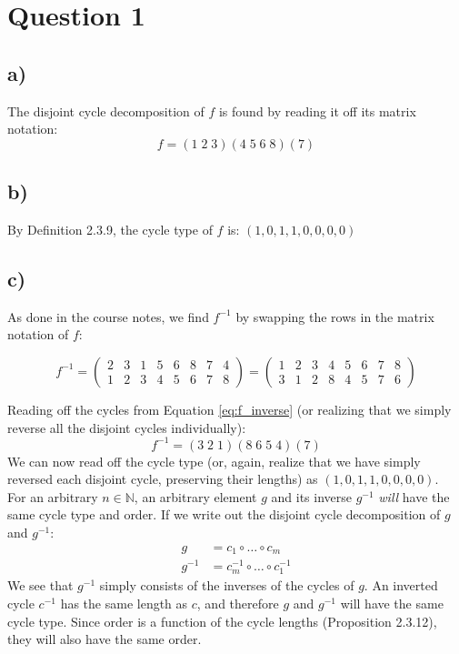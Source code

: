 \documentclass[a4paper,12pt]{article}
\begin{document}
\section*{Question 1}

\subsection*{a)}
The disjoint cycle decomposition of $f$ is found by reading it off its matrix notation:
\[
f = (1\;2\;3)(4\;5\;6\;8)(7)
\]

\subsection*{b)}
By Definition 2.3.9, the cycle type of $f$ is: $(1, 0, 1, 1, 0, 0, 0, 0)$

\subsection*{c)}
As done in the course notes, we find $f^{-1}$ by swapping the rows in the matrix notation of $f$:

\begin{equation}\label{eq:f_inverse}
f^{-1} = 
\begin{pmatrix}
    2 & 3 & 1 & 5 & 6 & 8 & 7 & 4 \\
    1 & 2 & 3 & 4 & 5 & 6 & 7 & 8
\end{pmatrix}
= 
\begin{pmatrix}
    1 & 2 & 3 & 4 & 5 & 6 & 7 & 8 \\
    3 & 1 & 2 & 8 & 4 & 5 & 7 & 6
\end{pmatrix}
\end{equation}

Reading off the cycles from Equation \ref{eq:f_inverse} (or realizing that we simply reverse all the disjoint cycles individually):
\[
f^{-1} = (3\;2\;1)(8\;6\;5\;4)(7)
\]
We can now read off the cycle type (or, again, realize that we have simply reversed each disjoint cycle, preserving their lengths) as $(1, 0, 1, 1, 0, 0, 0, 0)$.
\\

For an arbitrary $n \in \mathbb{N}$, an arbitrary element $g$ and its inverse $g^{-1}$ \emph{will} have the same cycle type and order. If we write out the disjoint cycle decomposition of $g$ and $g^{-1}$:
\begin{align*}
    g &= c_1 \circ \ldots \circ c_m \\
    g^{-1} &= c_m^{-1} \circ \ldots \circ c_1^{-1}
\end{align*}
We see that $g^{-1}$ simply consists of the inverses of the cycles of $g$. An inverted cycle $c^{-1}$ has the same length as $c$, and therefore $g$ and $g^{-1}$ will have the same cycle type. Since order is a function of the cycle lengths (Proposition 2.3.12), they will also have the same order.
\end{document}
